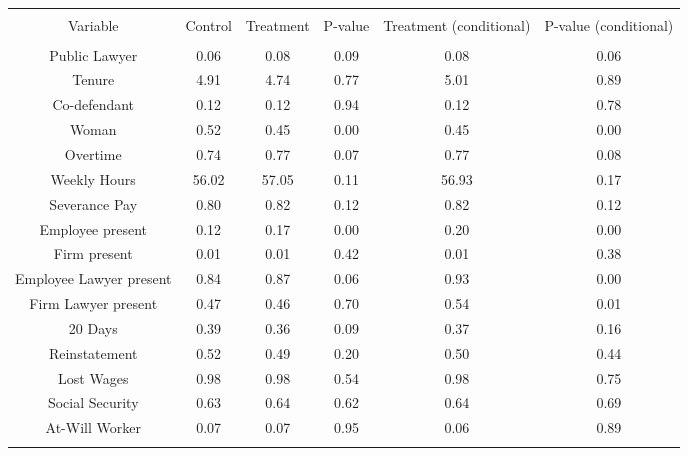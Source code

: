 
\begin{table}[!htbp] \centering 
  \caption{} 
  \label{} 
\begin{tabular}{@{\extracolsep{5pt}} cccccc} 
\\[-1.8ex]\hline 
\hline \\[-1.8ex] 
Variable & Control & Treatment & P-value & Treatment (conditional) & P-value (conditional) \\ 
\hline \\[-1.8ex] 
Public Lawyer &  0.06 &  0.08 & 0.09 &  0.08 & 0.06 \\ 
Tenure &  4.91 &  4.74 & 0.77 &  5.01 & 0.89 \\ 
Co-defendant &  0.12 &  0.12 & 0.94 &  0.12 & 0.78 \\ 
Woman &  0.52 &  0.45 & 0.00 &  0.45 & 0.00 \\ 
Overtime &  0.74 &  0.77 & 0.07 &  0.77 & 0.08 \\ 
Weekly Hours & 56.02 & 57.05 & 0.11 & 56.93 & 0.17 \\ 
Severance Pay &  0.80 &  0.82 & 0.12 &  0.82 & 0.12 \\ 
Employee present &  0.12 &  0.17 & 0.00 &  0.20 & 0.00 \\ 
Firm present &  0.01 &  0.01 & 0.42 &  0.01 & 0.38 \\ 
Employee Lawyer present &  0.84 &  0.87 & 0.06 &  0.93 & 0.00 \\ 
Firm Lawyer present &  0.47 &  0.46 & 0.70 &  0.54 & 0.01 \\ 
20 Days &  0.39 &  0.36 & 0.09 &  0.37 & 0.16 \\ 
Reinstatement &  0.52 &  0.49 & 0.20 &  0.50 & 0.44 \\ 
Lost Wages &  0.98 &  0.98 & 0.54 &  0.98 & 0.75 \\ 
Social Security &  0.63 &  0.64 & 0.62 &  0.64 & 0.69 \\ 
At-Will Worker &  0.07 &  0.07 & 0.95 &  0.06 & 0.89 \\ 
\hline \\[-1.8ex] 
\end{tabular} 
\end{table} 
